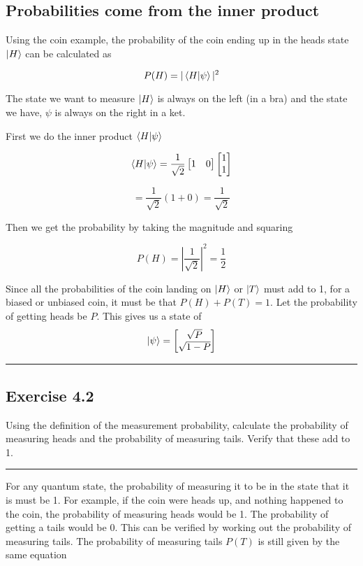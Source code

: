 \documentclass{book}
\begin{document}
\subsection{ Probabilities come from the inner product}

Using the coin example, the probability of the coin ending up in the heads state $\ket{H}$ can be calculated as

$$ P(H) = |\braket{H|\psi}|^2  $$

The state we want to measure $\ket{H}$ is always on the left (in a bra) and the state we have, $\psi$ is always on the right in a ket.

First we do the inner product $\braket{H|\psi}$

$$
\braket{H|\psi} = \frac{1}{\sqrt{2}}\begin{bmatrix} 1 & 0 \end{bmatrix} \begin{bmatrix} 1 \\ 1 \end{bmatrix}
$$

$$ = \frac{1}{\sqrt{2}} (1 + 0 ) = \frac{1}{\sqrt{2}}$$

Then we get the probability by taking the magnitude and squaring 

$$ P(H) = \left| \frac{1}{\sqrt{2}} \right|^2 = \frac{1}{2} $$

Since all the probabilities of the coin landing on $\ket{H}$ or $\ket{T}$ must add to 1, for a biased or unbiased coin, it must be that $P(H) + P(T) = 1$. Let the probability of getting heads be $P$. This gives us a state of 
$$
\ket{\psi} = \begin{bmatrix} \sqrt{P} \\ \sqrt{1-P} \end{bmatrix}
$$

\hrule

\subsection{Exercise 4.2}

Using the definition of the measurement probability, calculate the probability of measuring heads and the probability of measuring tails. Verify that these add to 1. \newline

\hrule  
\hspace{10}

For any quantum state, the probability of measuring it to be in the state that it is must be 1. For example, if the coin were heads up, and nothing happened to the coin, the probability of measuring heads would be 1. The probability of getting a tails would be 0. This can be verified by working out the probability of measuring tails. The probability of measuring tails $P(T)$ is still given by the same equation 
\end{document}
